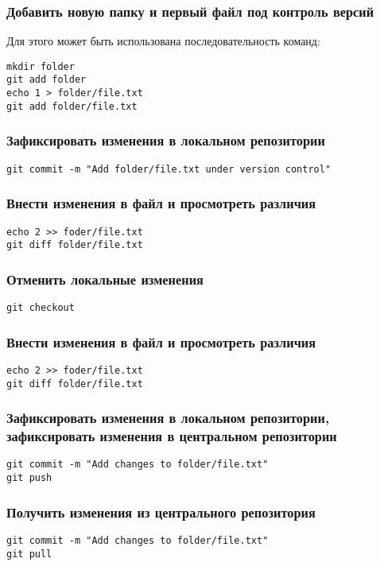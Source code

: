 \documentclass[10pt,a4paper]{article}
\begin{document}
\subsubsection{Добавить новую папку и первый файл под контроль версий}
Для этого может быть использована последовательность команд:
\begin{verbatim}mkdir folder
git add folder
echo 1 > folder/file.txt
git add folder/file.txt\end{verbatim}
\subsubsection{Зафиксировать изменения в локальном репозитории}
\begin{verbatim}git commit -m "Add folder/file.txt under version control"
\end{verbatim}
\subsubsection{Внести изменения в файл и просмотреть различия}
\begin{verbatim}echo 2 >> foder/file.txt
git diff folder/file.txt
\end{verbatim}
\subsubsection{Отменить локальные изменения}
\begin{verbatim}git checkout
\end{verbatim}
\subsubsection{Внести изменения в файл и просмотреть различия}
\begin{verbatim}echo 2 >> foder/file.txt
git diff folder/file.txt
\end{verbatim}
\subsubsection{Зафиксировать изменения в локальном репозитории, зафиксировать изменения в центральном репозитории}
\begin{verbatim}git commit -m "Add changes to folder/file.txt"
git push
\end{verbatim}
\subsubsection{Получить изменения из центрального репозитория}
\begin{verbatim}git commit -m "Add changes to folder/file.txt"
git pull
\end{verbatim}
\end{document}
